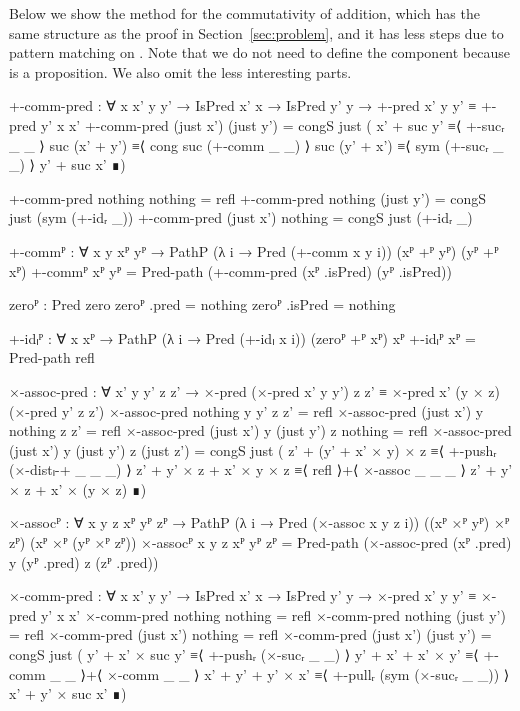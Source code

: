 Below we show the method for the commutativity of addition, which has the same
structure as the proof in Section~\ref{sec:problem}, and it has less steps due
to pattern matching on . Note that we do not need to define
the  component because  is a proposition.
We also omit the less interesting parts.
\begin{code}
  +-comm-pred :
    ∀ {x x' y y'} → IsPred x' x → IsPred y' y →
    +-pred x' y y' ≡ +-pred y' x x'
  +-comm-pred (just x') (just y') =
    congS just
      (  x' + suc y'    ≡⟨ +-sucᵣ _ _ ⟩
         suc (x' + y')  ≡⟨ cong suc (+-comm _ _) ⟩
         suc (y' + x')  ≡⟨ sym (+-sucᵣ _ _) ⟩
         y' + suc x'    ∎)
\end{code}
\begin{code}[hide]
  +-comm-pred nothing nothing = refl
  +-comm-pred nothing (just y') =
    congS just (sym (+-idᵣ _))
  +-comm-pred (just x') nothing =
    congS just (+-idᵣ _)

  +-commᴾ :
    ∀ {x y} xᴾ yᴾ → PathP (λ i → Pred (+-comm x y i)) (xᴾ +ᴾ yᴾ) (yᴾ +ᴾ xᴾ)
  +-commᴾ xᴾ yᴾ = Pred-path (+-comm-pred (xᴾ .isPred) (yᴾ .isPred))

  zeroᴾ : Pred zero
  zeroᴾ .pred = nothing
  zeroᴾ .isPred = nothing

  +-idₗᴾ : ∀ {x} xᴾ → PathP (λ i → Pred (+-idₗ x i)) (zeroᴾ +ᴾ xᴾ) xᴾ
  +-idₗᴾ xᴾ = Pred-path refl

  ×-assoc-pred :
    ∀ x' y y' z z' →
    ×-pred (×-pred x' y y') z z' ≡ ×-pred x' (y × z) (×-pred y' z z')
  ×-assoc-pred nothing y y' z z' = refl
  ×-assoc-pred (just x') y nothing z z' = refl
  ×-assoc-pred (just x') y (just y') z nothing = refl
  ×-assoc-pred (just x') y (just y') z (just z') =
    congS just
      ( z' + (y' + x' × y) × z     ≡⟨ +-pushᵣ (×-distₗ-+ _ _ _) ⟩
        z' + y' × z + x' × y × z   ≡⟨ refl ⟩+⟨ ×-assoc _ _ _ ⟩
        z' + y' × z + x' × (y × z) ∎)

  ×-assocᴾ : ∀ {x y z} xᴾ yᴾ zᴾ →
    PathP (λ i → Pred (×-assoc x y z i)) ((xᴾ ×ᴾ yᴾ) ×ᴾ zᴾ) (xᴾ ×ᴾ (yᴾ ×ᴾ zᴾ))
  ×-assocᴾ {x} {y} {z} xᴾ yᴾ zᴾ =
    Pred-path (×-assoc-pred (xᴾ .pred) y (yᴾ .pred) z (zᴾ .pred))

  ×-comm-pred :
    ∀ {x x' y y'} → IsPred x' x → IsPred y' y →
    ×-pred x' y y' ≡ ×-pred y' x x'
  ×-comm-pred nothing nothing = refl
  ×-comm-pred nothing (just y') = refl
  ×-comm-pred (just x') nothing = refl
  ×-comm-pred (just x') (just y') =
    congS just
      ( y' + x' × suc y'  ≡⟨ +-pushᵣ (×-sucᵣ _ _) ⟩
        y' + x' + x' × y' ≡⟨ +-comm _ _ ⟩+⟨ ×-comm _ _ ⟩
        x' + y' + y' × x' ≡⟨ +-pullᵣ (sym (×-sucᵣ _ _)) ⟩
        x' + y' × suc x' ∎)


\end{code}

